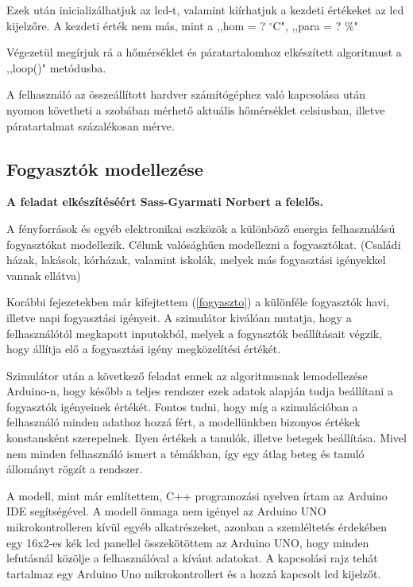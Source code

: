 \documentclass[
]{thesis-ekf}
\theoremstyle{definition}
\theoremstyle{remark}
\begin{document}
			
			\par Ezek után inicializálhatjuk az lcd-t, valamint kiírhatjuk a kezdeti értékeket az lcd kijelzőre. A kezdeti érték nem más, mint a ,,hom = ? $^{\circ}$C", ,,para = ? \%"				
			
			\par Végezetül megírjuk rá a hőmérséklet és páratartalomhoz elkészített algoritmust a ,,loop()" metódusba.
						
			\par A felhasználó az összeállított hardver számítógéphez való kapcsolása után nyomon követheti a szobában mérhető aktuális hőmérséklet celsiusban, illetve páratartalmat százalékosan mérve.
		\subsection{Fogyasztók modellezése}
			\textbf{A feladat elkészítéséért Sass-Gyarmati Norbert a felelős.} 
			\par A fényforrások és egyéb elektronikai eszközök a különböző energia felhasználású fogyasztókat modellezik. Célunk valósághűen modellezni a fogyasztókat. (Családi házak, lakások, kórházak, valamint iskolák, melyek más fogyasztási igényekkel vannak ellátva) 
			\par Korábbi fejezetekben már kifejtettem  (\ref{fogyaszto}) a különféle fogyasztók havi, illetve napi fogyasztási igényeit. A szimulátor kiválóan mutatja, hogy a felhasználótól megkapott inputokból, melyek a fogyasztók beállításait végzik, hogy állítja elő a fogyasztási igény megközelítési értékét. 
			\par Szimulátor után a következő feladat ennek az algoritmusnak lemodellezése Arduino-n, hogy később a teljes rendszer ezek adatok alapján tudja beállítani a fogyasztók igényeinek értékét. Fontos tudni, hogy míg a szimulációban a felhasználó minden adathoz hozzá fért, a modellünkben bizonyos értékek konstansként szerepelnek. Ilyen értékek a tanulók, illetve betegek beállítása. Mivel nem minden felhasználó ismert a témákban, így egy átlag beteg és tanuló állományt rögzít a rendszer. 
			\par A modell, mint már említettem, C++ programozási nyelven írtam az Arduino IDE segítségével. A  modell önmaga nem igényel az  Arduino UNO mikrokontrolleren kívül egyéb alkatrészeket, azonban a szemléltetés érdekében egy 16x2-es kék lcd panellel összekötöttem az Arduino UNO, hogy minden lefutásnál közölje a felhasználóval a kívánt adatokat. A kapcsolási rajz tehát tartalmaz egy Arduino Uno mikrokontrollert és a hozzá kapcsolt lcd kijelzőt.
\end{document}
